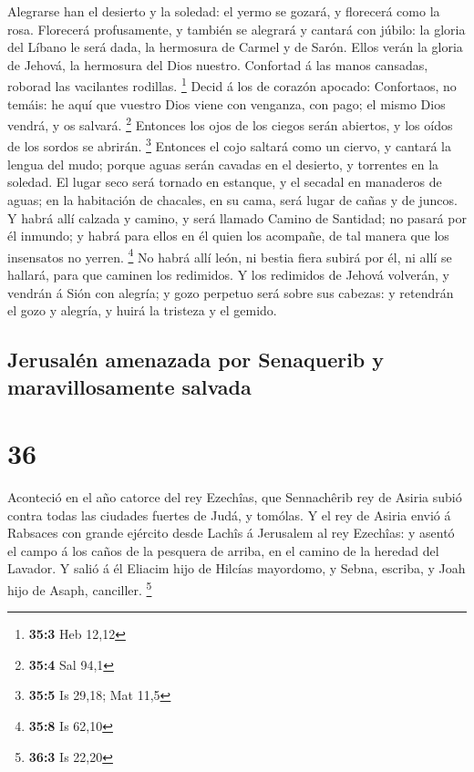  Alegrarse han el desierto y la soledad: el yermo se
gozará, y florecerá como la rosa.  Florecerá profusamente,
y también se alegrará y cantará con júbilo: la gloria del Líbano le será
dada, la hermosura de Carmel y de Sarón. Ellos verán la gloria de
Jehová, la hermosura del Dios nuestro.  Confortad á las
manos cansadas, roborad las vacilantes rodillas. \footnote{\textbf{35:3}
  Heb 12,12}  Decid á los de corazón apocado: Confortaos,
no temáis: he aquí que vuestro Dios viene con venganza, con pago; el
mismo Dios vendrá, y os salvará. \footnote{\textbf{35:4} Sal 94,1}
 Entonces los ojos de los ciegos serán abiertos, y los
oídos de los sordos se abrirán. \footnote{\textbf{35:5} Is 29,18; Mat
  11,5}  Entonces el cojo saltará como un ciervo, y
cantará la lengua del mudo; porque aguas serán cavadas en el desierto, y
torrentes en la soledad.  El lugar seco será tornado en
estanque, y el secadal en manaderos de aguas; en la habitación de
chacales, en su cama, será lugar de cañas y de juncos.  Y
habrá allí calzada y camino, y será llamado Camino de Santidad; no
pasará por él inmundo; y habrá para ellos en él quien los acompañe, de
tal manera que los insensatos no yerren. \footnote{\textbf{35:8} Is
  62,10}  No habrá allí león, ni bestia fiera subirá por
él, ni allí se hallará, para que caminen los redimidos. 
Y los redimidos de Jehová volverán, y vendrán á Sión con alegría; y gozo
perpetuo será sobre sus cabezas: y retendrán el gozo y alegría, y huirá
la tristeza y el gemido.

\hypertarget{jerusaluxe9n-amenazada-por-senaquerib-y-maravillosamente-salvada}{%
\subsection{Jerusalén amenazada por Senaquerib y maravillosamente
salvada}\label{jerusaluxe9n-amenazada-por-senaquerib-y-maravillosamente-salvada}}

\hypertarget{section-35}{%
\section{36}\label{section-35}}

 Aconteció en el año catorce del rey Ezechîas, que
Sennachêrib rey de Asiria subió contra todas las ciudades fuertes de
Judá, y tomólas.  Y el rey de Asiria envió á Rabsaces con
grande ejército desde Lachîs á Jerusalem al rey Ezechîas: y asentó el
campo á los caños de la pesquera de arriba, en el camino de la heredad
del Lavador.  Y salió á él Eliacim hijo de Hilcías
mayordomo, y Sebna, escriba, y Joah hijo de Asaph, canciller.
\footnote{\textbf{36:3} Is 22,20}

